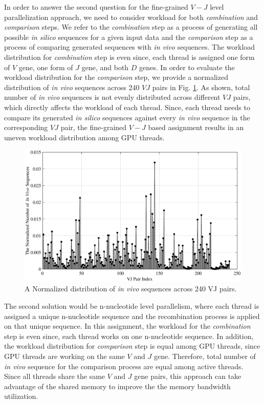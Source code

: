 In order to answer the second question for the fine-grained $V-J$ level parallelization approach, we need to consider workload for both \emph{combination} and \emph{comparison} steps. We refer to the \emph{combination} step as a process of generating all possible \emph{in silico} sequences for a given input data and the \emph{comparison} step as a process of comparing generated sequences with \emph{in vivo} sequences. The workload distribution for \emph{combination} step is even since, each thread is assigned one form of $V$ gene, one form of $J$ gene, and both $D$ genes. In order to evaluate the workload distribution for the \emph{comparison} step, we provide a normalized distribution of \emph{in vivo} sequences across 240 $VJ$ pairs in Fig. \ref{fig:240PE}. As shown, total number of \emph{in vivo} sequences is not evenly distributed across different $VJ$ pairs, which directly affects the workload of each thread. Since, each thread needs to compare its generated \emph{in silico} sequences against every \emph{in vivo} sequence in the corresponding $VJ$ pair, the fine-grained $V-J$ based assignment results in an uneven workload distribution among GPU threads. 

\begin{figure}[t!]
\begin{center}
\includegraphics[clip,width=1\columnwidth]{Figure/1.eps}

\caption{ A Normalized distribution of \emph{in vivo} sequences across 240 VJ pairs.}
\label{fig:240PE}
\end{center}
\end{figure}


The second solution would be n-nucleotide level parallelism, where each thread is assigned a unique n-nucleotide sequence and the recombination process is applied on that unique sequence. In this assignment, the workload for the \emph{combination} step is even since, each thread works on one n-nucleotide sequence. In addition, the workload distribution for \emph{comparison} step is equal among GPU threads, since GPU threads are working on the same $V$ and $J$ gene. Therefore, total number of \emph{in vivo} sequence for the comparison process are equal among active threads. Since all threads share the same $V$ and $J$ gene pairs, this approach can take advantage of the shared memory to improve the the memory bandwidth utilization. 

